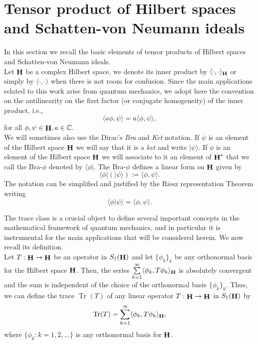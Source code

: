 \documentclass[a4paper,12pt,reqno]{amsart}
\theoremstyle{definition}
\theoremstyle{remark}
\numberwithin{equation}{section}
\newcommand{\ce}{\mathbb{C}}
\DeclareMathOperator{\Tr}{Tr}
\DeclareMathOperator{\Hi}{{\bf H}}
\begin{document}

 
 
\section{Tensor product of Hilbert spaces and Schatten-von Neumann ideals}\label{sec2}
In this section we recall the basic elements of  tensor products of Hilbert spaces and Schatten-von Neumann ideals. \\

Let $\Hi$ be a complex Hilbert space, we denote its inner product by $\langle \cdot,\cdot\rangle_{\Hi}$ or simply by $\langle \cdot,\cdot\rangle$ when there is not room for confusion. Since the main applications related to this work arise from  quantum mechanics, we adopt here the convention on the antilinearity on the first factor (or conjugate homogeneity) of the inner product, i.e., 
\[ \langle a\phi,\psi\rangle=\overline{a}\langle \phi,\psi\rangle,\]
 for all $\phi,\psi\in\Hi, a\in\ce.$\\

We will sometimes also use the Dirac's {\em Bra} and {\em Ket} notation. If $\psi$ is an element of the Hilbert space  $\Hi$ we will say that it is a {\em ket} and write $|\psi\rangle$. If  $\phi$ is an element of the Hilbert space  $\Hi$ we will associate to it an element of $\Hi^*$ that we call the Bra-$\phi$ denoted by  $\langle \phi|$. The  Bra-$\phi$ defines a
 linear form on $\Hi$ given by 
\[\langle \phi|(|\psi\rangle):=\langle \phi,\psi\rangle.\]
The notation can be simplified and justified by the Riesz representation Theorem writing
\[\langle \phi|\psi\rangle=\langle \phi,\psi\rangle.\]

 
The trace class is a crucial object to define several important concepts in the mathematical framework of quantum mechanics, and in particular it is instrumental  for the main applications that  will be considered herein. We now recall its definition. \\


Let $T:\Hi\rightarrow \Hi$ be an operator in $S_1(\Hi)$ and let  $\{\phi_k\}_k$ be any orthonormal basis for the Hilbert space $\Hi$. Then, the series $\sum\limits_{k=1}^{\infty}\langle \phi_k,T\phi_k\rangle_{\Hi}$ is absolutely convergent and the sum is independent of the choice of the orthonormal basis $\{\phi_k\}_k$. Thus, we can define the trace $\Tr (T)$ of any linear operator
$T:\Hi\rightarrow \Hi$ in $S_1(\Hi)$ by $$\Tr (T)=\sum\limits_{k=1}^{\infty}\langle \phi_k,T\phi_k\rangle_{\Hi},$$
where $\{\phi_k:k=1,2,\dots\}$ is any orthonormal basis for $\Hi$. \\
\end{document}
